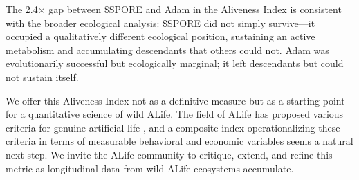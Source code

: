The 2.4$\times$ gap between \$SPORE and Adam in the Aliveness Index is consistent with the broader ecological analysis: \$SPORE did not simply survive---it occupied a qualitatively different ecological position, sustaining an active metabolism and accumulating descendants that others could not. Adam was evolutionarily successful but ecologically marginal; it left descendants but could not sustain itself.

We offer this Aliveness Index not as a definitive measure but as a starting point for a quantitative science of wild ALife. The field of ALife has proposed various criteria for genuine artificial life \cite{Bedau2003Artificial}, and a composite index operationalizing these criteria in terms of measurable behavioral and economic variables seems a natural next step. We invite the ALife community to critique, extend, and refine this metric as longitudinal data from wild ALife ecosystems accumulate.
